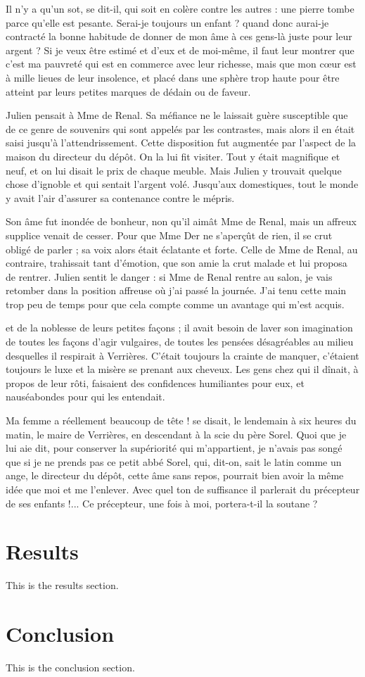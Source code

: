 \documentclass[english]{article}
\begin{document}
Il n’y a qu’un sot, se dit-il, qui soit en colère contre les autres : une pierre
tombe parce qu’elle est pesante. Serai-je toujours un enfant ? quand donc
aurai-je contracté la bonne habitude de donner de mon âme à ces gens-là juste
pour leur argent ? Si je veux être estimé et d’eux et de moi-même, il faut leur
montrer que c’est ma pauvreté qui est en commerce avec leur richesse, mais que
mon cœur est à mille lieues de leur insolence, et placé dans une sphère trop
haute pour être atteint par leurs petites marques de dédain ou de faveur.

Julien pensait à Mme de Renal. Sa méfiance ne le laissait guère susceptible que
de ce genre de souvenirs qui sont appelés par les contrastes, mais alors il en
était saisi jusqu’à l’attendrissement. Cette disposition fut augmentée par
l’aspect de la maison du directeur du dépôt. On la lui fit visiter. Tout y était
magnifique et neuf, et on lui disait le prix de chaque meuble. Mais Julien y
trouvait quelque chose d’ignoble et qui sentait l’argent volé. Jusqu’aux
domestiques, tout le monde y avait l’air d’assurer sa contenance contre le
mépris.

Son âme fut inondée de bonheur, non qu’il aimât Mme de Renal, mais un affreux
supplice venait de cesser. Pour que Mme Der ne s’aperçût de rien, il se
crut obligé de parler ; sa voix alors était éclatante et forte. Celle de Mme de
Renal, au contraire, trahissait tant d’émotion, que son amie la crut malade et
lui proposa de rentrer. Julien sentit le danger : si Mme de Renal rentre au
salon, je vais retomber dans la position affreuse où j’ai passé la journée. J’ai
tenu cette main trop peu de temps pour que cela compte comme un avantage qui
m’est acquis.

et de la noblesse de leurs petites façons ; il avait besoin de laver son
imagination de toutes les façons d’agir vulgaires, de toutes les pensées
désagréables au milieu desquelles il respirait à Verrières. C’était toujours la
crainte de manquer, c’étaient toujours le luxe et la misère se prenant aux
cheveux. Les gens chez qui il dînait, à propos de leur rôti, faisaient des
confidences humiliantes pour eux, et nauséabondes pour qui les entendait.

Ma femme a réellement beaucoup de tête ! se disait, le lendemain à six heures du
matin, le maire de Verrières, en descendant à la scie du père Sorel. Quoi que je
lui aie dit, pour conserver la supériorité qui m’appartient, je n’avais pas
songé que si je ne prends pas ce petit abbé Sorel, qui, dit-on, sait le latin
comme un ange, le directeur du dépôt, cette âme sans repos, pourrait bien avoir
la même idée que moi et me l’enlever. Avec quel ton de suffisance il parlerait
du précepteur de ses enfants !... Ce précepteur, une fois à moi, portera-t-il la
soutane ?


\section{Results}
This is the results section.

\section{Conclusion}
This is the conclusion section.

\end{document}
